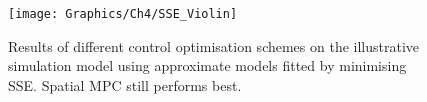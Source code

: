 \vspace*{2cm}
\begin{figure}[H]
    \begin{center}
        \texttt{[image: Graphics/Ch4/SSE\_Violin]}
        \caption[Comparing control strategies with alternative fitting method]{Results of different control optimisation schemes on the illustrative simulation model using approximate models fitted by minimising SSE\@. Spatial MPC still performs best.\label{fig:sse_violin}}
    \end{center}
\end{figure}
